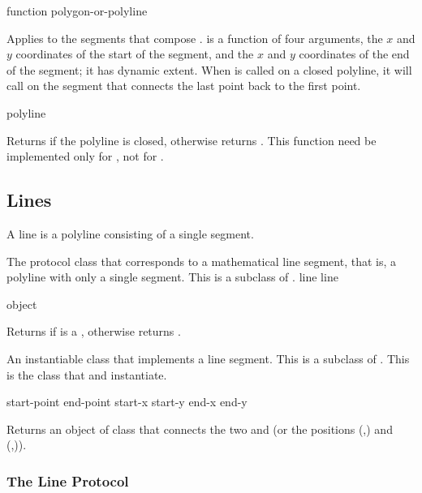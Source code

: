  {function polygon-or-polyline}

Applies  to the segments that compose .
 is a function of four arguments, the $x$ and $y$ coordinates of
the start of the segment, and the $x$ and $y$ coordinates of the end of the
segment; it has dynamic extent.  When  is called
on a closed polyline, it will call  on the segment that connects
the last point back to the first point.

 {polyline}

Returns  if the polyline  is closed, otherwise returns
.  This function need be implemented only for , not
for .


\subsection {Lines}

A line is a polyline consisting of a single segment.


The protocol class that corresponds to a mathematical line segment, that is, a
polyline with only a single segment.  This is a subclass of .
 {line} {line}

 {object}

Returns  if  is a , otherwise returns
.


An instantiable class that implements a line segment.  This is a subclass of
.  This is the class that  and 
instantiate.
\Immutable

  {start-point end-point}
 {start-x start-y end-x end-y}

Returns an object of class  that connects the two
  and  (or the positions
(,) and (,)).

\MayCaptureInputs


\subsubsection {The Line Protocol}


